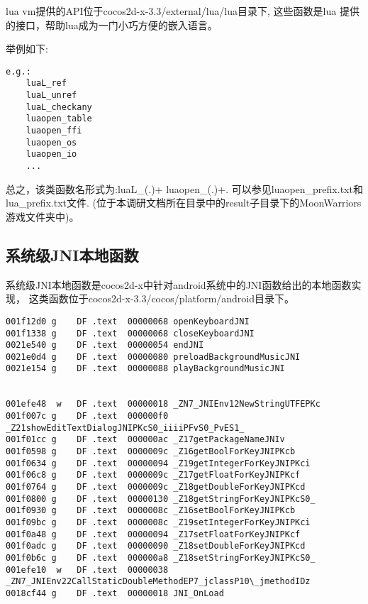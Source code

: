 lua vm提供的API位于cocos2d-x-3.3/external/lua/lua目录下,
这些函数是lua 提供的接口，帮助lua成为一门小巧方便的嵌入语言。

举例如下:
\begin{lstlisting}
e.g.:
	luaL_ref
	luaL_unref
	luaL_checkany
	luaopen_table
	luaopen_ffi
	luaopen_os
	luaopen_io
	...
\end{lstlisting}
总之，该类函数名形式为:luaL\_(.)+ luaopen\_(.)+.
可以参见luaopen\_prefix.txt和lua\_prefix.txt文件.
(位于本调研文档所在目录中的result子目录下的MoonWarriors游戏文件夹中)。

\subsection{系统级JNI本地函数}
\label{sec:so:sysjnilib}
系统级JNI本地函数是cocos2d-x中针对android系统中的JNI函数给出的本地函数实现，
这类函数位于cocos2d-x-3.3/cocos/platform/android目录下。
\begin{lstlisting}
001f12d0 g    DF .text  00000068 openKeyboardJNI
001f1338 g    DF .text  00000068 closeKeyboardJNI
0021e540 g    DF .text  00000054 endJNI
0021e0d4 g    DF .text  00000080 preloadBackgroundMusicJNI
0021e154 g    DF .text  00000088 playBackgroundMusicJNI


001efe48  w   DF .text  00000018 _ZN7_JNIEnv12NewStringUTFEPKc
001f007c g    DF .text  000000f0 _Z21showEditTextDialogJNIPKcS0_iiiiPFvS0_PvES1_
001f01cc g    DF .text  000000ac _Z17getPackageNameJNIv
001f0598 g    DF .text  0000009c _Z16getBoolForKeyJNIPKcb
001f0634 g    DF .text  00000094 _Z19getIntegerForKeyJNIPKci
001f06c8 g    DF .text  0000009c _Z17getFloatForKeyJNIPKcf
001f0764 g    DF .text  0000009c _Z18getDoubleForKeyJNIPKcd
001f0800 g    DF .text  00000130 _Z18getStringForKeyJNIPKcS0_
001f0930 g    DF .text  0000008c _Z16setBoolForKeyJNIPKcb
001f09bc g    DF .text  0000008c _Z19setIntegerForKeyJNIPKci
001f0a48 g    DF .text  00000094 _Z17setFloatForKeyJNIPKcf
001f0adc g    DF .text  00000090 _Z18setDoubleForKeyJNIPKcd
001f0b6c g    DF .text  000000a8 _Z18setStringForKeyJNIPKcS0_
001efe10  w   DF .text  00000038 _ZN7_JNIEnv22CallStaticDoubleMethodEP7_jclassP10\_jmethodIDz
0018cf44 g    DF .text  00000018 JNI_OnLoad
\end{lstlisting}

